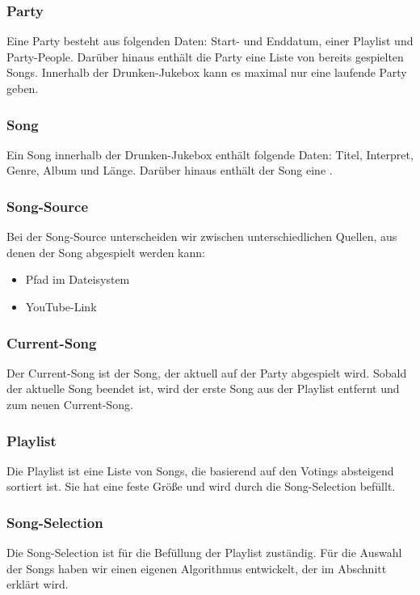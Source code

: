 \subsubsection{Party}
Eine Party besteht aus folgenden Daten: Start- und Enddatum, einer Playlist und Party-People. Darüber hinaus enthält die Party eine Liste von bereits gespielten Songs. Innerhalb der Drunken-Jukebox kann es maximal nur eine laufende Party geben.

\subsubsection{Song}
\label{sec:Song}
Ein Song innerhalb der Drunken-Jukebox enthält folgende Daten: Titel, Interpret, Genre, Album und Länge. Darüber hinaus enthält der Song eine .

\subsubsection{Song-Source}
\label{sec:SongSource}

Bei der Song-Source unterscheiden wir zwischen unterschiedlichen Quellen, aus denen der Song abgespielt werden kann:
\begin{itemize}
	\item Pfad im Dateisystem 
	\item YouTube-Link
\end{itemize}

\subsubsection{Current-Song}
Der Current-Song ist der Song, der aktuell auf der Party abgespielt wird. Sobald der aktuelle Song beendet ist, wird der erste Song aus der Playlist entfernt und zum neuen Current-Song. 

\subsubsection{Playlist}
Die Playlist ist eine Liste von Songs, die basierend auf den Votings absteigend sortiert ist. Sie hat eine feste Größe und wird durch die Song-Selection befüllt.

\subsubsection{Song-Selection}
Die Song-Selection ist für die Befüllung der Playlist zuständig. Für die Auswahl der Songs haben wir einen eigenen Algorithmus entwickelt, der im Abschnitt  erklärt wird.


